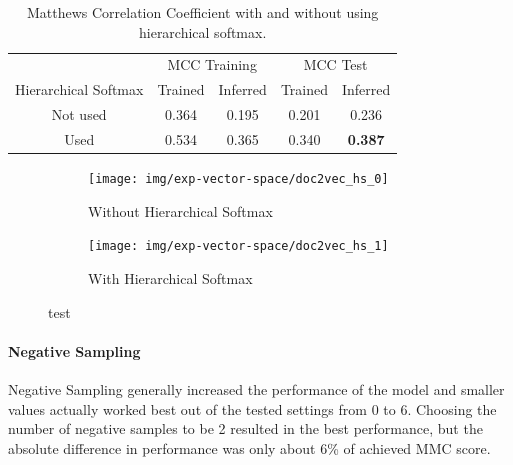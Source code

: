 \begin{table}[h]
  \begin{center}
    \begin{tabular}{ c | *2c | *2c }
      \toprule
       & \multicolumn{2}{c|}{MCC Training} & \multicolumn{2}{|c}{MCC Test}\\
      Hierarchical Softmax & Trained & Inferred & Trained & Inferred \\
      \midrule
      Not used & 0.364 & 0.195 & 0.201 & 0.236 \\
      Used     & 0.534 & 0.365 & 0.340 & \textbf{0.387} \\
    \bottomrule
  \end{tabular}
  \caption{Matthews Correlation Coefficient with and without using hierarchical softmax.}
\label{tab:Paragraph Vector Parameter Results Hierarchical Softmax}
\end{center}
\end{table}

\begin{figure}[h!]
    \centering
    \begin{subfigure}[b]{0.49\textwidth}
      \texttt{[image: img/exp-vector-space/doc2vec\_hs\_0]}
      \caption{Without Hierarchical Softmax}
\label{fig:doc2vec_hs_0}
    \end{subfigure}
    \begin{subfigure}[b]{0.49\textwidth}
      \texttt{[image: img/exp-vector-space/doc2vec\_hs\_1]}
    \caption{With Hierarchical Softmax}
\label{fig:doc2vec_hs_1}
    \end{subfigure}
\caption{test}
\label{fig:doc2vec_hs}
\end{figure}

\paragraph{Negative Sampling}
Negative Sampling generally increased the performance of the model and smaller values actually worked best out of the tested settings from 0 to 6. Choosing the number of negative samples to be 2 resulted in the best performance, but the absolute difference in performance was only about 6\% of achieved MMC score.

